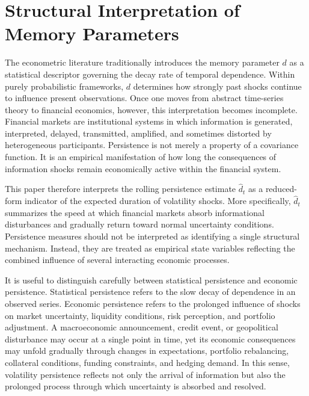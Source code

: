 \documentclass[unnumsec,webpdf,contemporary,large]{oup-authoring-template}%
\theoremstyle{thmstyleone}%
\theoremstyle{thmstyletwo}%
\theoremstyle{thmstylethree}%
\begin{document}
\section{Structural Interpretation of Memory Parameters}
\label{sec:structural}

The econometric literature traditionally introduces the memory parameter
$d$ as a statistical descriptor governing the decay rate of temporal
dependence. Within purely probabilistic frameworks, $d$ determines how
strongly past shocks continue to influence present observations. Once one
moves from abstract time-series theory to financial economics, however,
this interpretation becomes incomplete. Financial markets are institutional
systems in which information is generated, interpreted, delayed,
transmitted, amplified, and sometimes distorted by heterogeneous
participants. Persistence is not merely a property of a covariance function.
It is an empirical manifestation of how long the consequences of information
shocks remain economically active within the financial system.

This paper therefore interprets the rolling persistence estimate $\hat d_t$
as a reduced-form indicator of the expected duration of volatility shocks.
More specifically, $\hat d_t$ summarizes the speed at which financial
markets absorb informational disturbances and gradually return toward normal
uncertainty conditions. Persistence measures should not be interpreted as
identifying a single structural mechanism. Instead, they are treated as
empirical state variables reflecting the combined influence of several
interacting economic processes.

It is useful to distinguish carefully between statistical persistence and
economic persistence. Statistical persistence refers to the slow decay of
dependence in an observed series. Economic persistence refers to the
prolonged influence of shocks on market uncertainty, liquidity conditions,
risk perception, and portfolio adjustment. A macroeconomic announcement,
credit event, or geopolitical disturbance may occur at a single point in
time, yet its economic consequences may unfold gradually through changes in
expectations, portfolio rebalancing, collateral conditions, funding
constraints, and hedging demand. In this sense, volatility persistence
reflects not only the arrival of information but also the prolonged process
through which uncertainty is absorbed and resolved.
\end{document}
